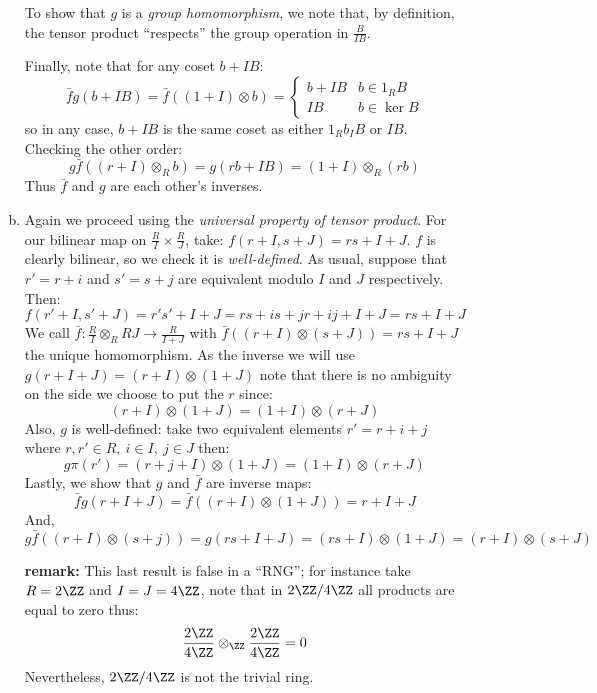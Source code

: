 \begin{description}
\begin{enumerate}[(a)]
            To show that $g$ is a \emph{group homomorphism}, we note that, by definition, the tensor product ``respects'' the group operation in $\frac B{IB}$.

            Finally, note that for any coset $b+IB$:
            $$\bar f g(b+IB)=\bar f((1+I)\otimes b)=\begin{cases}
                b+IB & b\in 1_RB\\ 
                IB & b \in \ker B
            \end{cases}$$
            so in any case, $b+IB$ is the same coset as either $1_Rb_IB$ or $IB$. Checking the other order:
            $$g\bar f((r+I)\otimes_R b) = g(rb+IB)=(1+I)\otimes_R(rb)$$
            Thus $\bar f$ and $g$ are each other's inverses. 
        \item Again we proceed using the \emph{universal property of tensor product}. For our bilinear map on $\frac RI\times \frac RJ$, take: $f(r+I,s+J)=rs+I+J$. $f$ is clearly bilinear, so we check it is \emph{well-defined}. As usual, suppose that $r'=r+i$ and $s'=s+j$ are equivalent modulo $I$ and $J$ respectively. Then:
            $$f(r'+I,s'+J)= r's'+I+J=rs+is+jr +ij+I+J= rs+I+J$$
            We call $\bar f: \frac RI \otimes_R RJ \to \frac R{I+J}$ with $\bar f((r+I) \otimes (s+J))=rs+I+J$ the unique homomorphism. As the inverse we will use $g(r+I+J) = (r+I)\otimes (1+J)$ note that there is no ambiguity on the side we choose to put the $r$ since:
            $$(r+I)\otimes (1+J) = (1+I)\otimes(r+J)$$
            Also, $g$ is well-defined: take two equivalent elements $r' = r+i+j$ where $r,r'\in R,\ i\in I,\ j\in J$ then:
            $$g\pi(r')=(r+j+I)\otimes (1+J)=(1+I)\otimes (r+J)$$
            Lastly, we show that $g$ and $\bar f$ are inverse maps:
            $$\bar fg(r+I+J) = \bar f((r+I)\otimes(1+J))=r+I+J$$
            And,
            $$g\bar f((r+I)\otimes (s+j))= g(rs+I+J)=(rs+I)\otimes(1+J) = (r+I)\otimes(s+J)$$

            \textbf{remark:} This last result is false in a ``RNG''; for instance take $R=2\ZZ$ and $I=J=4\ZZ$, note that in $2\ZZ/4\ZZ$ all products are equal to zero thus:
            $$\frac {2\ZZ}{4\ZZ}\otimes_\ZZ \frac{2\ZZ}{4\ZZ} = 0$$
            Nevertheless, $2\ZZ/4\ZZ$ is not the trivial ring.
    \end{enumerate}
\end{description}
